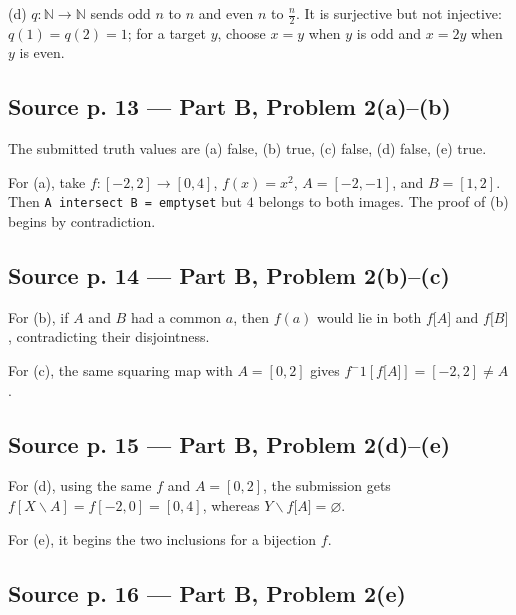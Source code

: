 (d) \(q:\mathbb{N}\rightarrow\mathbb{N}\) sends odd \(n\) to \(n\) and even \(n\) to \(\frac{n}{2}\). It is surjective but not injective: \(q(1) = q(2) = 1\); for a target \(y\), choose \(x = y\) when \(y\) is odd and \(x = 2y\) when \(y\) is even.

\subsection{Source p. 13 --- Part B, Problem 2(a)--(b)}

The submitted truth values are (a) false, (b) true, (c) false, (d) false, (e) true.

For (a), take \(f:\left\lbrack {- 2,2} \right\rbrack\rightarrow\left\lbrack {0,4} \right\rbrack\), \(f(x) = x^{2}\), \(A = \left\lbrack {- 2, - 1} \right\rbrack\), and \(B = \left\lbrack {1,2} \right\rbrack\). Then \texttt{A\ intersect\ B\ =\ emptyset} but \(4\) belongs to both images. The proof of (b) begins by contradiction.

\subsection{Source p. 14 --- Part B, Problem 2(b)--(c)}

For (b), if \(A\) and \(B\) had a common \(a\), then \(f(a)\) would lie in both \(f\lbrack A\rbrack\) and \(f\lbrack B\rbrack\), contradicting their disjointness.

For (c), the same squaring map with \(A = \left\lbrack {0,2} \right\rbrack\) gives \(f^{-}1\left\lbrack {f\lbrack A\rbrack} \right\rbrack = \left\lbrack {- 2,2} \right\rbrack \neq A\).

\subsection{Source p. 15 --- Part B, Problem 2(d)--(e)}

For (d), using the same \(f\) and \(A = \left\lbrack {0,2} \right\rbrack\), the submission gets \(f\left\lbrack {X \smallsetminus A} \right\rbrack = f\left\lbrack {- 2,0} \right\rbrack = \left\lbrack {0,4} \right\rbrack\), whereas \(Y \smallsetminus f\lbrack A\rbrack = \varnothing\).

For (e), it begins the two inclusions for a bijection \(f\).

\subsection{Source p. 16 --- Part B, Problem 2(e)}

